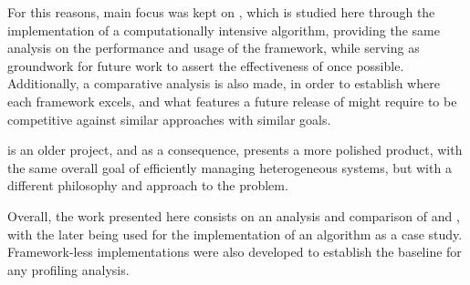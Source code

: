 \documentclass[main.tex]{subfiles}
\begin{document}
 For this reasons, main focus was kept on \starpu, which is studied here through the implementation of a computationally intensive algorithm, providing the same analysis on the performance and usage of the framework, while serving as groundwork for future work to assert the effectiveness of \gama once possible. Additionally, a comparative analysis is also made, in order to establish where each framework excels, and what features a future release of \gama might require to be competitive against similar approaches with similar goals.

\starpu is an older project, and as a consequence, presents a more polished product, with the same overall goal of efficiently managing heterogeneous systems, but with a different philosophy and approach to the problem.

Overall, the work presented here consists on an analysis and comparison of \gama and \starpu, with the later being used for the implementation of an algorithm as a case study. Framework-less implementations were also developed to establish the baseline for any profiling analysis.
\end{document}
